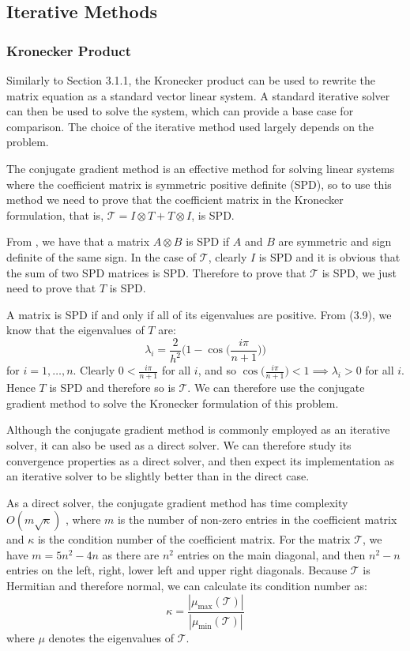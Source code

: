\documentclass[11pt]{article}
\numberwithin{equation}{section}
\begin{document}
\newpage

\subsection{Iterative Methods}

\subsubsection{Kronecker Product}
Similarly to Section 3.1.1, the Kronecker product can be used to rewrite the matrix equation as a standard vector linear system. A standard iterative solver can then be used to solve the system, which can provide a base case for comparison. The choice of the iterative method used largely depends on the problem.

The conjugate gradient method is an effective method for solving linear systems where the coefficient matrix is symmetric positive definite (SPD), so to use this method we need to prove that the coefficient matrix in the Kronecker formulation, that is, $\mathcal{T} = I \otimes T + T \otimes I$, is SPD.

From \cite{Brewer}, we have that a matrix $A \otimes B$ is SPD if $A$ and $B$ are symmetric and sign definite of the same sign. In the case of $\mathcal{T}$, clearly $I$ is SPD and it is obvious that the sum of two SPD matrices is SPD. Therefore to prove that $\mathcal{T}$ is SPD, we just need to prove that $T$ is SPD. 

A matrix is SPD if and only if all of its eigenvalues are positive. From (3.9), we know that the eigenvalues of $T$ are: 
\[ \lambda_i = \frac{2}{h^2} \Big( 1 - \cos \Big( \frac{i \pi}{n+1} \Big) \Big) \]
for $i=1, \dots, n$. Clearly $0 < \frac{i \pi}{n+1}$ for all $i$, and so $\cos \Big( \frac{i \pi}{n+1} \Big) < 1 \implies \lambda_i > 0$ for all $i$. Hence $T$ is SPD and therefore so is $\mathcal{T}$. We can therefore use the conjugate gradient method to solve the Kronecker formulation of this problem. 

Although the conjugate gradient method is commonly employed as an iterative solver, it can also be used as a direct solver. We can therefore study its convergence properties as a direct solver, and then expect its implementation as an iterative solver to be slightly better than in the direct case. 

As a direct solver, the conjugate gradient method has time complexity $O(m\sqrt{\kappa})$ \cite{Shewchuk}, where $m$ is the number of non-zero entries in the coefficient matrix and $\kappa$ is the condition number of the coefficient matrix. For the matrix $\mathcal{T}$, we have $m=5n^2 - 4n$ as there are $n^2$ entries on the main diagonal, and then $n^2 - n$ entries on the left, right, lower left and upper right diagonals. Because $\mathcal{T}$ is Hermitian and therefore normal, we can calculate its condition number as:
\begin{equation}
\kappa = \frac{|\mu_{\text{max}}(\mathcal{T})|}{|\mu_{\text{min}}(\mathcal{T})|}
\end{equation}
where $\mu$ denotes the eigenvalues of $\mathcal{T}$. 
\end{document}
